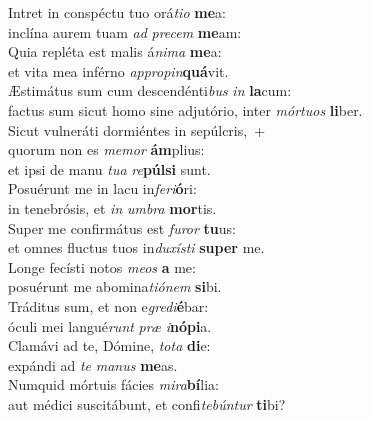 \evenverse Intret in conspéctu tuo orá\textit{ti}\textit{o} \textbf{me}a:~\*\\
\evenverse inclína aurem tuam \textit{ad} \textit{pre}\textit{cem} \textbf{me}am:\\
\oddverse Quia repléta est malis á\textit{ni}\textit{ma} \textbf{me}a:~\*\\
\oddverse et vita mea inférno \textit{ap}\textit{pro}\textit{pin}\textbf{quá}vit.\\
\evenverse Æstimátus sum cum descendénti\textit{bus} \textit{in} \textbf{la}cum:~\*\\
\evenverse factus sum sicut homo sine adjutório, inter \textit{mór}\textit{tu}\textit{os} \textbf{li}ber.\\
\oddverse Sicut vulneráti dormiéntes in sepúlcris,~+\\
\oddverse  quorum non es \textit{me}\textit{mor} \textbf{ám}plius:~\*\\
\oddverse et ipsi de manu \textit{tu}\textit{a} \textit{re}\textbf{púl}\textbf{si} sunt.\\
\evenverse Posuérunt me in lacu in\textit{fe}\textit{ri}\textbf{ó}ri:~\*\\
\evenverse in tenebrósis, et \textit{in} \textit{um}\textit{bra} \textbf{mor}tis.\\
\oddverse Super me confirmátus est \textit{fu}\textit{ror} \textbf{tu}us:~\*\\
\oddverse et omnes fluctus tuos in\textit{du}\textit{xí}\textit{sti} \textbf{su}\textbf{per} me.\\
\evenverse Longe fecísti notos \textit{me}\textit{os} \textbf{a} me:~\*\\
\evenverse posuérunt me abomina\textit{ti}\textit{ó}\textit{nem} \textbf{si}bi.\\
\oddverse Tráditus sum, et non e\textit{gre}\textit{di}\textbf{é}bar:~\*\\
\oddverse óculi mei langué\textit{runt} \textit{præ} \textit{i}\textbf{nó}\textbf{pi}a.\\
\evenverse Clamávi ad te, Dómine, \textit{to}\textit{ta} \textbf{di}e:~\*\\
\evenverse expándi ad \textit{te} \textit{ma}\textit{nus} \textbf{me}as.\\
\oddverse Numquid mórtuis fácies \textit{mi}\textit{ra}\textbf{bí}lia:~\*\\
\oddverse aut médici suscitábunt, et confi\textit{te}\textit{bún}\textit{tur} \textbf{ti}bi?\\
